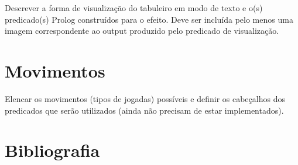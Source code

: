 \documentclass[a4paper]{article}
\begin{document}
Descrever a forma de visualização do tabuleiro em modo de texto e o(s) predicado(s) Prolog construídos para o efeito.
Deve ser incluída pelo menos uma imagem correspondente ao output produzido pelo predicado de visualização.


\section{Movimentos}

Elencar os movimentos (tipos de jogadas) possíveis e definir os cabeçalhos dos predicados que serão utilizados (ainda não precisam de estar implementados).

\section*{Bibliografia}

\end{document}
